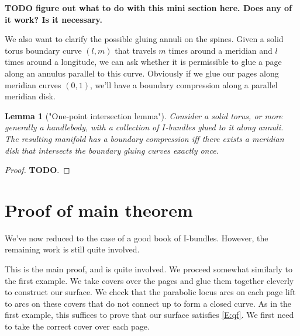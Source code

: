 \documentclass[12pt]{amsart}
\newtheorem{lemma}[theorem]{Lemma}
\theoremstyle{definition}
\theoremstyle{remark}
\begin{document}
{\tiny

\textbf{TODO figure out what to do with this mini section here. Does any of it
work? Is it necessary.}

We also want to clarify the possible gluing annuli on the spines. Given a solid
torus boundary curve $(l,m)$ that travels $m$ times around a meridian and $l$
times around a longitude, we can ask whether it is permissible to glue a page
along an annulus parallel to this curve. Obviously if we glue our pages along
meridian curves $(0,1)$, we'll have a boundary compression along a parallel
meridian disk.


\begin{lemma}["One-point intersection lemma"]

Consider a solid torus, or more generally a handlebody, with a collection of
$I$-bundles glued to it along annuli. The resulting manifold has a boundary
compression iff there exists a meridian disk that intersects the boundary
gluing curves exactly once.

\end{lemma}

\begin{proof}

\textbf{TODO}.

\end{proof}

}
\section{Proof of main theorem}

We've now reduced to the case of a good book of I-bundles. However, the
remaining work is still quite involved.

This is the main proof, and is quite involved. We proceed somewhat similarly to
the first example. We take covers over the pages and glue them together
cleverly to construct our surface. We check that the parabolic locus arcs on
each page lift to arcs on these covers that do not connect up to form a closed
curve. As in the first example, this suffices to prove that our surface
satisfies \eqref{E:qf}. We first need to take the correct cover over each page.
\end{document}

